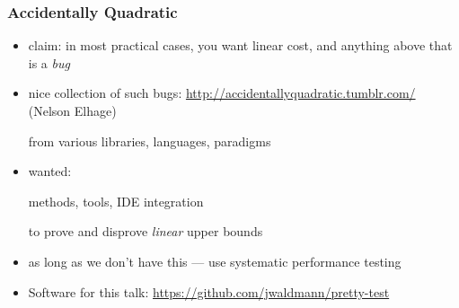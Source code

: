 \begin{frame}[fragile]
\frametitle{Accidentally Quadratic}

\begin{itemize}[<+->]
\item 
claim: 
in most practical cases, 
you want linear cost,
and anything above that is a \emph{bug}

\item
nice collection of such bugs:
\url{http://accidentallyquadratic.tumblr.com/}
(Nelson Elhage)

from various libraries, languages, paradigms


\item
wanted:

methods, tools, IDE integration 

to prove and disprove \emph{linear} upper bounds
\item 
  as long as we don't have this 
  --- use systematic performance testing
\item
  Software for this talk: \url{https://github.com/jwaldmann/pretty-test}
\end{itemize}

\end{frame}
